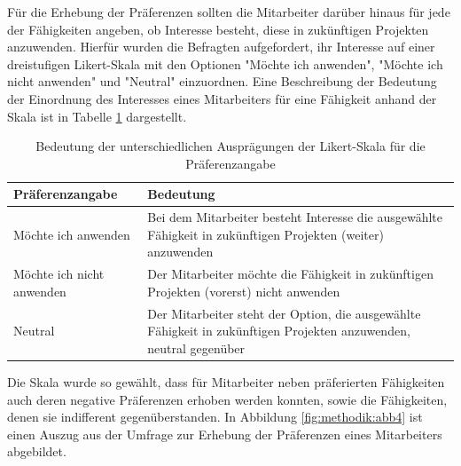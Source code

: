 Für die Erhebung der Präferenzen sollten die Mitarbeiter darüber hinaus für jede der Fähigkeiten angeben, ob Interesse besteht, diese in zukünftigen Projekten anzuwenden.
Hierfür wurden die Befragten aufgefordert, ihr Interesse auf einer dreistufigen Likert-Skala mit den Optionen "Möchte ich anwenden", "Möchte ich nicht anwenden" und "Neutral" einzuordnen.
Eine Beschreibung der Bedeutung der Einordnung des Interesses eines Mitarbeiters für eine Fähigkeit anhand der Skala ist in Tabelle \ref{tab:methodik:tab2} dargestellt.

\begin{table}[htbp]
    \begin{center}
    \begin{tabular}{p{1.5in}|p{3.25in}}
    {\textbf{Präferenzangabe}} & {\textbf{Bedeutung}}\\
    \hline
	Möchte ich anwenden & Bei dem Mitarbeiter besteht Interesse die ausgewählte Fähigkeit in zukünftigen Projekten (weiter) anzuwenden \\
    \hline
    Möchte ich nicht anwenden & Der Mitarbeiter möchte die Fähigkeit in zukünftigen Projekten (vorerst) nicht anwenden \\
    \hline
    Neutral & Der Mitarbeiter steht der Option, die ausgewählte Fähigkeit in zukünftigen Projekten anzuwenden, neutral gegenüber \\
    \end{tabular}
    \end{center}
    \caption[Bedeutung der unterschiedlichen Ausprägungen der Likert-Skala für die Präferenzangabe]{Bedeutung der unterschiedlichen Ausprägungen der Likert-Skala für die Präferenzangabe}
	\label{tab:methodik:tab2}
\end{table}

Die Skala wurde so gewählt, dass für Mitarbeiter neben präferierten Fähigkeiten auch deren negative Präferenzen erhoben werden konnten, sowie die Fähigkeiten, denen sie indifferent gegenüberstanden.
In Abbildung \ref{fig:methodik:abb4} ist einen Auszug aus der Umfrage zur Erhebung der Präferenzen eines Mitarbeiters abgebildet.

